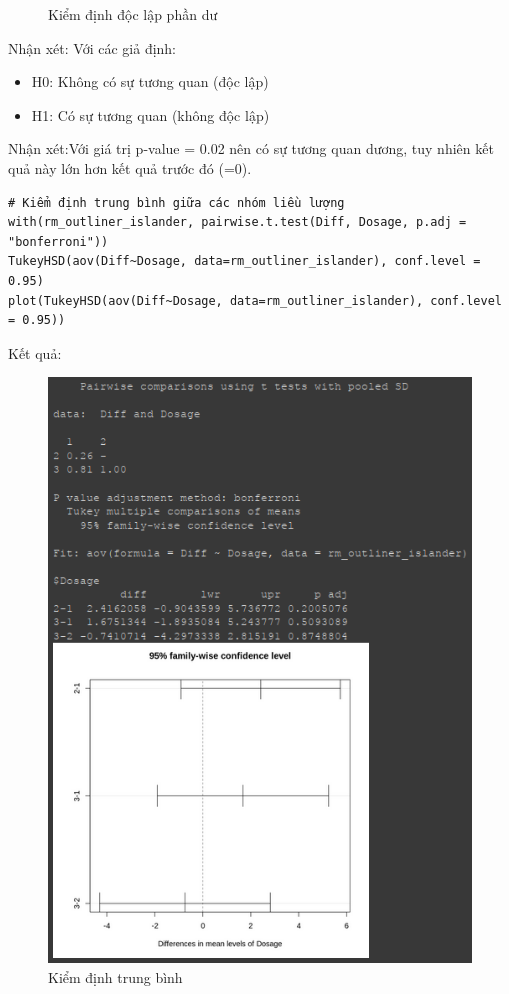 \begin{itemize}
\begin{figure}[H]
        \caption{Kiểm định độc lập phần dư}
        \label{fig:Kiểm định độc lập phần dư_}
    \end{figure}
        Nhận xét:
    Với các giả định:
        \begin{itemize}
            \item H0: Không có sự tương quan (độc lập)
            \item H1: Có sự tương quan (không độc lập)
        \end{itemize}
    Nhận xét:Với giá trị p-value = 0.02 nên có sự tương quan dương, tuy nhiên kết quả này lớn hơn kết quả trước đó (=0).
    \begin{lstlisting}
# Kiểm định trung bình giữa các nhóm liều lượng
with(rm_outliner_islander, pairwise.t.test(Diff, Dosage, p.adj = "bonferroni"))
TukeyHSD(aov(Diff~Dosage, data=rm_outliner_islander), conf.level = 0.95)
plot(TukeyHSD(aov(Diff~Dosage, data=rm_outliner_islander), conf.level = 0.95))
    \end{lstlisting}
    Kết quả:
    \begin{figure}[H]
        \centering
        \includegraphics[width=0.8\linewidth]{part01_figures/35.png}
        \caption{Kiểm định trung bình}
        \label{fig:Kiểm định trung bình_}
    \end{figure}


\end{itemize}

